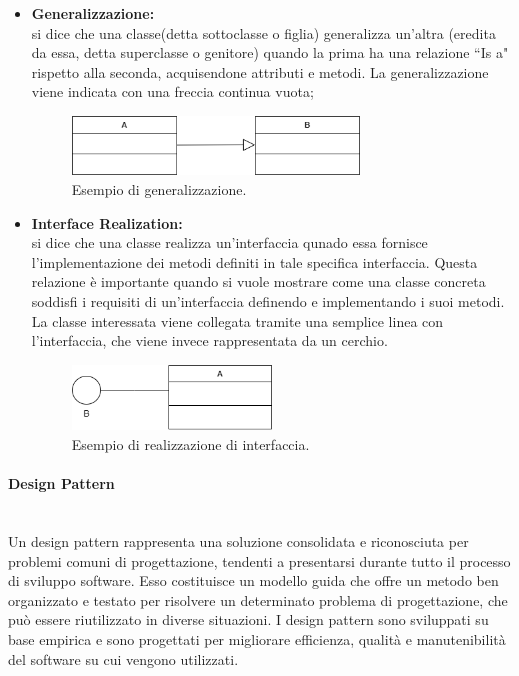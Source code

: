 \documentclass[8pt]{article}
\newcommand{\subsubsubsection}[1]{\paragraph{#1}\mbox{}\\}
\begin{document}
\begin{itemize}
    \item \textbf{Generalizzazione:}\\ si dice che una classe(detta sottoclasse o figlia) generalizza un'altra (eredita da essa, detta superclasse o genitore) quando la prima ha una relazione ``Is a" rispetto alla seconda, acquisendone attributi e metodi. La generalizzazione viene indicata con una freccia continua vuota;
    \begin{figure}[h!]
        \centering
        \includegraphics[width=0.72\textwidth]{images_ndp/inheritance.png}
        \caption{Esempio di generalizzazione.}
        \label{fig:Esempio di generalizzazione}
    \end{figure}
    \item \textbf{Interface Realization:}\\ si dice che una classe realizza un'interfaccia qunado essa fornisce l'implementazione dei metodi definiti in tale specifica interfaccia. Questa relazione è importante quando si vuole mostrare come una classe concreta soddisfi i requisiti di un'interfaccia definendo e implementando i suoi metodi. La classe interessata viene collegata tramite una semplice linea con l'interfaccia, che viene invece rappresentata da un cerchio.
    \begin{figure}[h!]
        \centering
        \includegraphics[width=0.5\textwidth]{images_ndp/interface.png}
        \caption{Esempio di realizzazione di interfaccia.}
        \label{fig:Esempio di realizzazione di interfaccia}
    \end{figure}
\end{itemize}
\subsubsubsection{Design Pattern}
Un design pattern rappresenta una soluzione consolidata e riconosciuta per problemi comuni di progettazione, tendenti a presentarsi durante tutto il processo di sviluppo software.
Esso costituisce un modello guida che offre un metodo ben organizzato e testato per risolvere un determinato problema di progettazione, che può essere riutilizzato in diverse situazioni.
I design pattern sono sviluppati su base empirica e sono progettati per migliorare efficienza, qualità e manutenibilità del software su cui vengono utilizzati.
\end{document}
